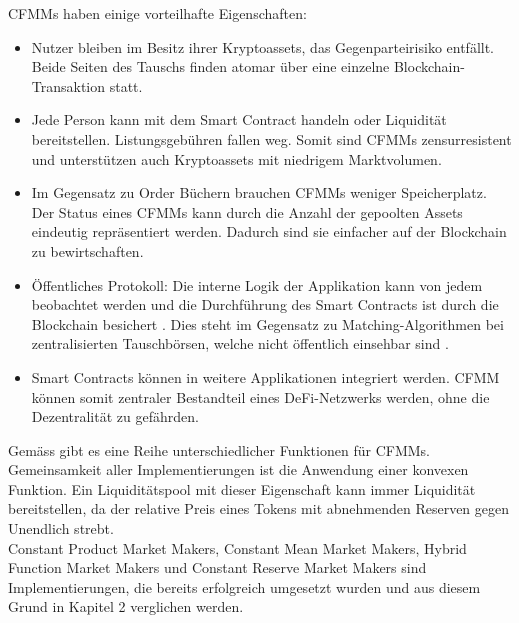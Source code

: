 \documentclass[12pt,a4paper,titlepage,oneside,english]{article}
\begin{document}
CFMMs haben einige vorteilhafte Eigenschaften: 
\begin{itemize}
	\item Nutzer bleiben im Besitz ihrer Kryptoassets, das Gegenparteirisiko entfällt. Beide Seiten des Tauschs finden atomar 			über eine einzelne Blockchain-Transaktion statt. \citep[vgl.][S.8]{Schaer2020}
	\item Jede Person kann mit dem Smart Contract handeln oder Liquidität bereitstellen. Listungsgebühren fallen weg. 
	Somit sind CFMMs zensurresistent und unterstützen auch Kryptoassets mit niedrigem Marktvolumen. \citep{Joel2020}
	\item Im Gegensatz zu Order Büchern brauchen CFMMs weniger Speicherplatz. Der Status eines CFMMs kann durch die Anzahl der 			gepoolten Assets eindeutig repräsentiert werden. Dadurch sind sie einfacher auf der Blockchain zu bewirtschaften. \citep[vgl][S.3]{Angeris2019}
	\item Öffentliches Protokoll: Die interne Logik der Applikation kann von jedem beobachtet werden und die Durchführung des Smart Contracts ist durch die Blockchain besichert \citep[vgl.][S.2]{Schaer2020}. Dies steht im Gegensatz zu Matching-Algorithmen bei zentralisierten Tauschbörsen, welche nicht öffentlich einsehbar sind \citep[vgl.][S.3]{Angeris2019}.
	\item Smart Contracts können in weitere Applikationen integriert werden. CFMM können somit zentraler Bestandteil eines DeFi-Netzwerks werden, ohne die Dezentralität zu gefährden. \citep[vgl.][S.4]{Schaer2020}
\end{itemize}

Gemäss \citet{Schaer2020} gibt es eine Reihe unterschiedlicher Funktionen für CFMMs. Gemeinsamkeit aller Implementierungen ist die Anwendung einer konvexen Funktion. Ein Liquiditätspool mit dieser Eigenschaft kann immer Liquidität bereitstellen, da der relative Preis eines Tokens mit abnehmenden Reserven gegen Unendlich strebt. \citep[vgl.][S.9]{Schaer2020}\\
Constant Product Market Makers, Constant Mean Market Makers, Hybrid Function Market Makers und Constant Reserve Market Makers sind Implementierungen, die bereits erfolgreich umgesetzt wurden und aus diesem Grund in Kapitel 2 verglichen werden. \\
\end{document}
